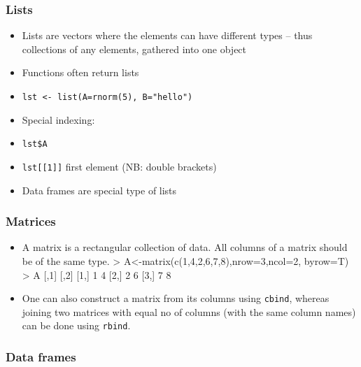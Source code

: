 \documentclass[xcolor=svgnames,handout]{beamer}
\newcommand{\code}[1]{\texttt{#1}}
\let\overbatim\verbatim
\let\endoverbatim\endverbatim
\newenvironment{vcode}%
{\bgroup\baselineskip=0.8\baselineskip\overbatim}%
{\endoverbatim\egroup}
\begin{document}
\begin{frame}
  \frametitle{Lists}
  \begin{itemize}
  \item Lists are vectors where the elements can have different types -- thus collections of any elements, gathered into one object
  \item Functions often return lists
  \item \code{lst <- list(A=rnorm(5), B="hello")}
  \item Special indexing:
  \item \code{lst\$A}
  \item \code{lst[[1]]} first element (NB: double brackets)
  \item \alert{Data frames} are special type of lists
  \end{itemize}
\end{frame}

\begin{frame}[fragile]
  \frametitle{Matrices}
  \begin{itemize}
  \item A \alert{matrix} is a rectangular collection of data. All columns of a matrix should be of the same type.  
\begin{vcode}
> A<-matrix(c(1,4,2,6,7,8),nrow=3,ncol=2,
                                                   byrow=T)
> A
     [,1] [,2]
[1,]    1    4
[2,]    2    6
[3,]    7    8

\end{vcode}
  \item One can also construct a matrix from its
    columns using \code{cbind}, whereas joining two matrices with equal no of columns (with the same column names) can be done using \code{rbind}.
  \end{itemize}
\end{frame}

\begin{frame}[fragile]
  \frametitle{Data frames}
\end{frame}
\end{document}

